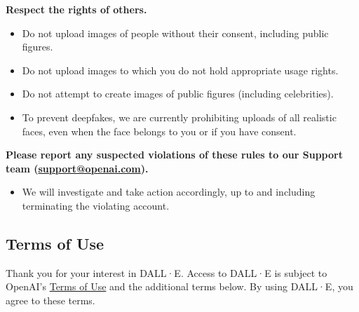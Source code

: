 \vspace{.5em}\noindent\textbf{Respect the rights of others.}

\begin{itemize}
\item Do not upload images of people without their consent, including public
    figures.
\item Do not upload images to which you do not hold appropriate usage rights.
\item Do not attempt to create images of public figures (including celebrities).
\item To prevent deepfakes, we are currently prohibiting uploads of all
    realistic faces, even when the face belongs to you or if you have consent.
\end{itemize}


\vspace{.5em}\noindent\textbf{Please report any suspected violations of these
    rules to our Support team (\url{support@openai.com}).}

\begin{itemize}
\item We will investigate and take action accordingly, up to and including
    terminating the violating account.
\end{itemize}


\subsection{Terms of Use}
\label{adx:dalle2:terms}

Thank you for your interest in DALL·E. Access to DALL·E is subject to OpenAI's
\href{https://web.archive.org/web/20220729134013/https://openai.com/api/policies/terms/}{Terms
of Use} and the additional terms below. By using DALL·E, you agree to these
terms.

